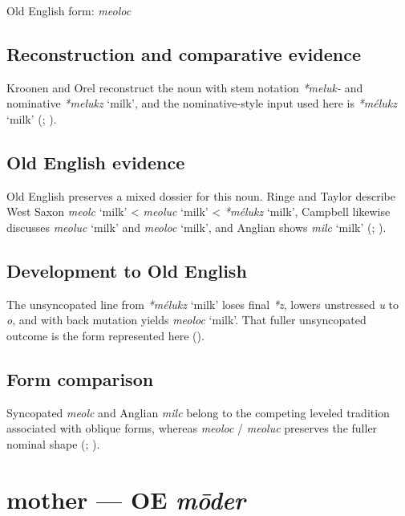 \documentclass[
  british,
  a4paper,
  openany]{book}
\providecommand{\Recon}[1]{\emph{*#1}}
{\catcode`→=\active \global\def→{\ensuremath{\rightarrow}}}
\providecommand{\texorpdfstring}[2]{#1}
\providecommand{\Recon}[1]{\emph{*#1}}
{\catcode`→=\active \global\def→{\ensuremath{\rightarrow}}}
\begin{document}
Old English form: \emph{meoloc}

\subsection{Reconstruction and comparative
evidence}\label{reconstruction-and-comparative-evidence-38}

Kroonen and Orel reconstruct the noun with stem notation \emph{*meluk-}
and nominative \Recon{melukz} `milk', and the nominative-style input
used here is \Recon{mélukz} `milk' (; ).

\subsection{Old English evidence}\label{old-english-evidence-38}

Old English preserves a mixed dossier for this noun. Ringe and Taylor
describe West Saxon \emph{meolc} `milk' \textless{} \emph{meoluc} `milk'
\textless{} \Recon{mélukz} `milk', Campbell likewise discusses
\emph{meoluc} `milk' and {\emph{meoloc}} `milk', and Anglian shows
\emph{milc} `milk' (; ).

\subsection{Development to Old
English}\label{development-to-old-english-38}

The unsyncopated line from \Recon{mélukz} `milk' loses final \emph{*z},
lowers unstressed \emph{u} to \emph{o}, and with back mutation yields
{\emph{meoloc}} `milk'. That fuller unsyncopated outcome is the form
represented here ().

\subsection{Form comparison}\label{form-comparison-2}

Syncopated \emph{meolc} and Anglian \emph{milc} belong to the competing
leveled tradition associated with oblique forms, whereas \emph{meoloc} /
\emph{meoluc} preserves the fuller nominal shape
(;
).

\section{\texorpdfstring{mother --- OE
\emph{mōder}}{mother --- OE mōder}}\label{mother-oe-mux14dder}
\end{document}

